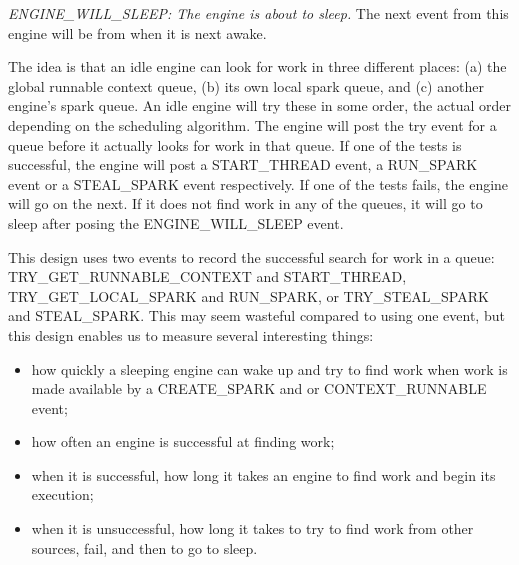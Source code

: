 \emph{ENGINE\_WILL\_SLEEP: The engine is about to sleep.}
The next event from this engine will be from when it is next awake.

The idea is that an idle engine can look for work in three different places:
(a) the global runnable context queue,
(b) its own local spark queue, and
(c) another engine's spark queue.
An idle engine will try these in some order,
the actual order depending on the scheduling algorithm.
The engine will post the try event for a queue
before it actually looks for work in that queue.
If one of the tests is successful, the engine will post
a START\_THREAD event, a RUN\_SPARK event or a STEAL\_SPARK event respectively.
If one of the tests fails, the engine will go on the next.
If it does not find work in any of the queues,
it will go to sleep after posing the ENGINE\_WILL\_SLEEP event.

This design uses two events to record
the successful search for work in a queue:
TRY\_GET\_RUNNABLE\_CONTEXT and START\_THREAD,
TRY\_GET\_LOCAL\_SPARK and RUN\_SPARK,
or TRY\_STEAL\_SPARK and STEAL\_SPARK.
This may seem wasteful compared to using one event,
but this design enables us to measure several interesting things:
\vspace{-2mm}
\begin{itemize}
\item
how quickly a sleeping engine can wake up and try to find work
when work is made available by a CREATE\_SPARK and or CONTEXT\_RUNNABLE event;
\item
how often an engine is successful at finding work;
\item
when it is successful,
how long it takes an engine to find work and begin its execution;
\item
when it is unsuccessful,
how long it takes to try to find work from other sources,
fail, and then to go to sleep.
\end{itemize}
\vspace{-2mm}


